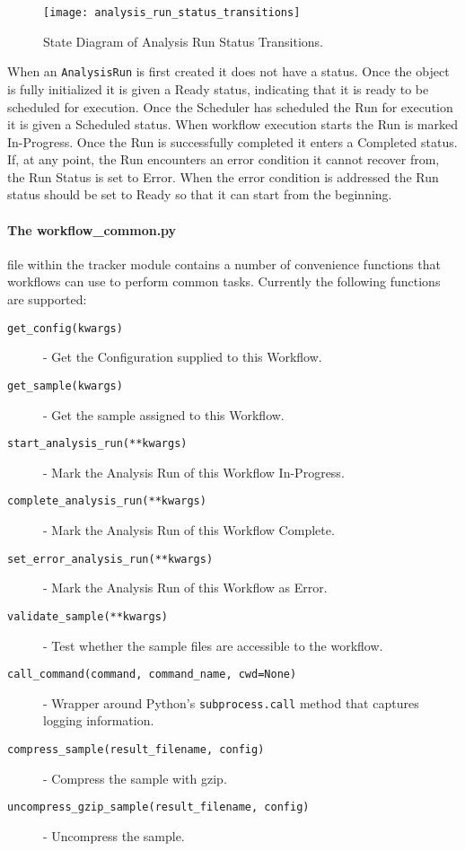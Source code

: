 \begin{figure}[h!]
\texttt{[image: analysis\_run\_status\_transitions]}
\centering
\caption {State Diagram of Analysis Run Status Transitions.}
\label{fig:analysis_run_status_transitions}
\end{figure}

When an \texttt{AnalysisRun} is first created it does not have a status. Once the object is fully initialized it is given a Ready status, indicating that it is ready to be scheduled for execution. Once the Scheduler has scheduled the Run for execution it is given a Scheduled status. When workflow execution starts the Run is marked In-Progress. Once the Run is successfully completed it enters a Completed status. If, at any point, the Run encounters an error condition it cannot recover from, the Run Status is set to Error. When the error condition is addressed the Run status should be set to Ready so that it can start from the beginning.

\paragraph{The workflow\_common.py} file within the tracker module contains a number of convenience functions that workflows can use to perform common tasks. Currently the following functions are supported:

\begin{description}
\item [\texttt{get_config(kwargs)}] - Get the Configuration supplied to this Workflow.
\item [\texttt{get_sample(kwargs)}] - Get the sample assigned to this Workflow.
\item [\texttt{start_analysis_run(**kwargs)}] - Mark the Analysis Run of this Workflow In-Progress.
\item [\texttt{complete_analysis_run(**kwargs)}] - Mark the Analysis Run of this Workflow Complete. 
\item [\texttt{set_error_analysis_run(**kwargs)}] - Mark the Analysis Run of this Workflow as Error.
\item [\texttt{validate_sample(**kwargs)}] - Test whether the sample files are accessible to the workflow.
\item [\texttt{call_command(command, command_name, cwd=None)}] - Wrapper around Python's \texttt{subprocess.call} method that captures logging information.
\item [\texttt{compress_sample(result_filename, config)}] - Compress the sample with gzip.
\item [\texttt{uncompress_gzip_sample(result_filename, config)}] - Uncompress the sample.
\end{description}

